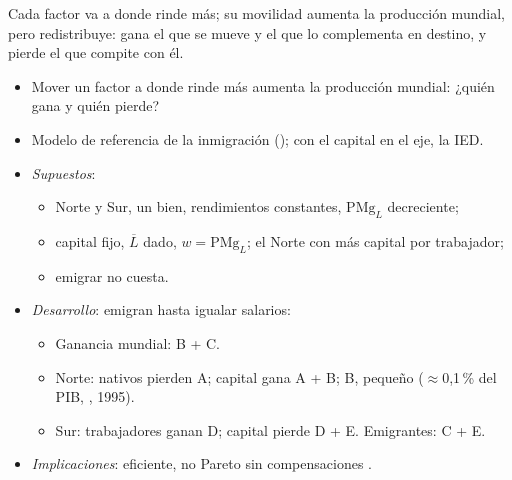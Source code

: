 \documentclass{article}
\begin{document}
\begin{columnas}
\begin{ideaclave}
Cada factor va a donde rinde más; su movilidad aumenta la producción mundial, pero redistribuye: gana el que se mueve y el que lo complementa en destino, y pierde el que compite con él.
\end{ideaclave}

\begin{itemize}
\item Mover un factor a donde rinde más aumenta la producción mundial: ¿quién gana y quién pierde?
\item Modelo de referencia de la inmigración (); con el capital en el eje, la IED.
\end{itemize}
\begin{itemize}
\item \emph{Supuestos}:
  \begin{itemize}
  \item Norte y Sur, un bien, rendimientos constantes, $\mathrm{PMg}_L$ decreciente;
  \item capital fijo, $\overline L$ dado, $w=\mathrm{PMg}_L$; el Norte con más capital por trabajador;
  \item emigrar no cuesta.
  \end{itemize}
\item \emph{Desarrollo}: emigran hasta igualar salarios:
  \begin{itemize}
  \item Ganancia mundial: B + C.
  \item Norte: nativos pierden A; capital gana A + B;  B, pequeño ($\approx$0,1\,\% del PIB, , 1995).
  \item Sur: trabajadores ganan D; capital pierde D + E. Emigrantes: C + E.
  \end{itemize}
\end{itemize}
\begin{itemize}
\item \emph{Implicaciones}: eficiente, no Pareto sin compensaciones .
\end{itemize}

\end{columnas}
\end{document}
